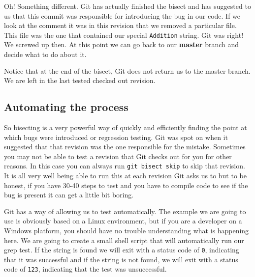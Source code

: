 Oh! Something different.  Git has actually finished the bisect and has suggested to us that this commit was responsible for introducing the bug in our code.
If we look at the comment it was in this revision that we removed a particular file.
This file was the one that contained our special \texttt{Addition} string.
Git was right! We screwed up then.  At this point we can go back to our \textbf{master} branch and decide what to do about it.


Notice that at the end of the bisect, Git does not return us to the master branch.
We are left in the last tested checked out revision.


\subsection{Automating the process}
So bisecting is a very powerful way of quickly and efficiently finding the point at which bugs were introduced or regression testing.
Git was spot on when it suggested that that revision was the one responsible for the mistake.
Sometimes you may not be able to test a revision that Git checks out for you for other reasons.
In this case you can always run \texttt{git bisect skip} to skip that revision.
It is all very well being able to run this at each revision Git asks us to but to be honest, if you have 30-40 steps to test and you have to compile code to see if the bug is present it can get a little bit boring.

Git has a way of allowing us to test automatically.
The example we are going to use is obviously based on a Linux environment, but if you are a developer on a Windows platform, you should have no trouble understanding what is happening here.
We are going to create a small shell script that will automatically run our grep test.
If the string is found we will exit with a status code of \texttt{0}, indicating that it was successful and if
the string is not found, we will exit with a status code of \texttt{123}, indicating that the test was unsuccessful.

